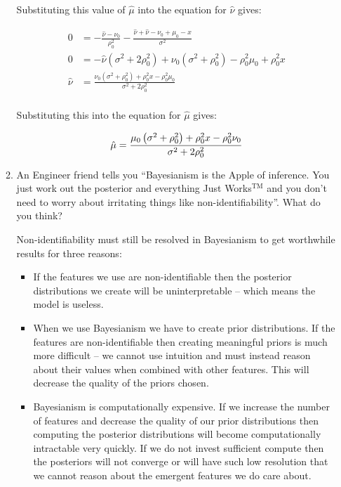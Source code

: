 \documentclass[10pt,\jkfside,a4paper]{article}
\begin{document}
\begin{enumerate}
\begin{enumerate}[label=(\alph*)]
Substituting this value of $\hat{\mu}$ into the equation for
$\hat{\nu}$ gives:

\[
\begin{split}
0 &= -\frac{\hat{\nu} - \nu_0}{\rho_0^2} - \frac{\hat{\nu} + \hat{\nu} -
\nu_0 + \mu_0 - x}{\sigma^2} \\
0 &= -\hat{\nu}\left( \sigma^2 + 2\rho_0^2 \right) + \nu_0\left(\sigma^2 +
\rho_0^2\right) - \rho_0^2\mu_0 + \rho_0^2 x\\
\hat{\nu} &= \frac{\nu_0\left(\sigma^2 + \rho_0^2\right) + \rho_0^2 x -
\rho_0^2\mu_0}{\sigma^2 + 2\rho_0^2} \\
\end{split}
\]

Substituting this into the equation for $\hat{\mu}$ gives:

\[
\hat{\mu} = \frac{\mu_0\left(\sigma^2 + \rho_0^2\right) + \rho_0^2 x-
\rho_0^2\nu_0}{\sigma^2 + 2\rho_0^2} \\
\]

\item An Engineer friend tells you ``Bayesianism is the Apple of inference.
You just work out the posterior and everything Just Works$^{\text{TM}}$ and
you don't need to worry about irritating things like non-identifiability''.
What do you think?

Non-identifiability must still be resolved in Bayesianism to get worthwhile
results for three reasons:

\begin{itemize}

\item If the features we use are non-identifiable then the posterior
distributions we create will be uninterpretable -- which means the model is
useless.

\item When we use Bayesianism we have to create prior distributions. If the
features are non-identifiable then creating meaningful priors is much more
difficult -- we cannot use intuition and must instead reason about their
values when combined with other features. This will decrease the quality of
the priors chosen.

\item Bayesianism is computationally expensive. If we increase the number of
features and decrease the quality of our prior distributions then computing
the posterior distributions will become computationally intractable very
quickly. If we do not invest sufficient compute then the posteriors will
not converge or will have such low resolution that we cannot reason about
the emergent features we do care about.


\end{itemize}
\end{enumerate}
\end{enumerate}
\end{document}

